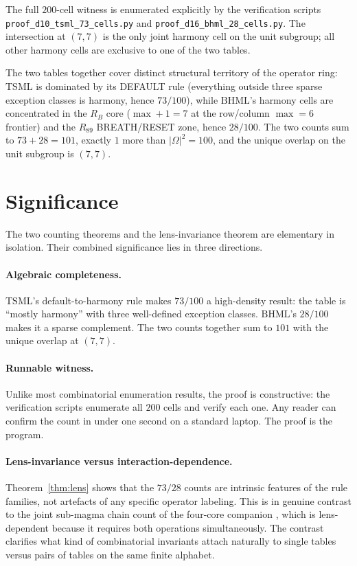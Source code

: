 \documentclass[11pt,reqno]{amsart}
\theoremstyle{plain}
\theoremstyle{definition}
\theoremstyle{remark}
\newcommand{\TSML}{\mathrm{TSML}}
\newcommand{\BHML}{\mathrm{BHML}}
\begin{document}
The full $200$-cell witness is enumerated explicitly by the
verification scripts \texttt{proof\_d10\_tsml\_73\_cells.py} and
\texttt{proof\_d16\_bhml\_28\_cells.py}. The intersection at
$(7, 7)$ is the only joint harmony cell on the unit subgroup; all
other harmony cells are exclusive to one of the two tables.

The two tables together cover distinct structural territory of the
operator ring: $\TSML$ is dominated by its DEFAULT rule (everything
outside three sparse exception classes is harmony, hence
$73/100$), while $\BHML$'s harmony cells are concentrated in the
$R_B$ core ($\max + 1 = 7$ at the row/column $\max = 6$ frontier)
and the $R_{89}$ BREATH/RESET zone, hence $28/100$. The two counts
sum to $73 + 28 = 101$, exactly $1$ more than $|\Omega|^2 = 100$,
and the unique overlap on the unit subgroup is $(7, 7)$.

\section{Significance}\label{sec:sig}

The two counting theorems and the lens-invariance theorem are
elementary in isolation. Their combined significance lies in three
directions.

\paragraph{Algebraic completeness.}
$\TSML$'s default-to-harmony rule makes $73/100$ a high-density
result: the table is ``mostly harmony'' with three well-defined
exception classes. $\BHML$'s $28/100$ makes it a sparse complement.
The two counts together sum to $101$ with the unique overlap at
$(7, 7)$.

\paragraph{Runnable witness.}
Unlike most combinatorial enumeration results, the proof is
constructive: the verification scripts enumerate all $200$ cells
and verify each one. Any reader can confirm the count in under one
second on a standard laptop. The proof is the program.

\paragraph{Lens-invariance versus interaction-dependence.}
Theorem~\ref{thm:lens} shows that the $73/28$ counts are intrinsic
features of the rule families, not artefacts of any specific
operator labeling. This is in genuine contrast to the joint
sub-magma chain count of the four-core companion \cite{J15}, which
is lens-dependent because it requires both operations
simultaneously. The contrast clarifies what kind of combinatorial
invariants attach naturally to single tables versus pairs of
tables on the same finite alphabet.
\end{document}
